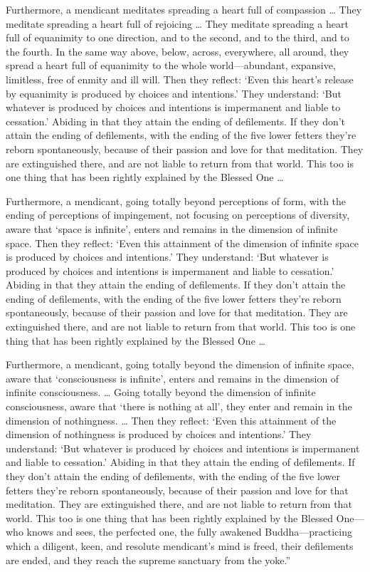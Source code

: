 \documentclass[12pt,openany]{book}%
\begin{document}
Furthermore, a mendicant meditates spreading a heart full of compassion … They meditate spreading a heart full of rejoicing … They meditate spreading a heart full of equanimity to one direction, and to the second, and to the third, and to the fourth. In the same way above, below, across, everywhere, all around, they spread a heart full of equanimity to the whole world—abundant, expansive, limitless, free of enmity and ill will. Then they reflect: ‘Even this heart’s release by equanimity is produced by choices and intentions.’ They understand: ‘But whatever is produced by choices and intentions is impermanent and liable to cessation.’ Abiding in that they attain the ending of defilements. If they don’t attain the ending of defilements, with the ending of the five lower fetters they’re reborn spontaneously, because of their passion and love for that meditation. They are extinguished there, and are not liable to return from that world. This too is one thing that has been rightly explained by the Blessed One … 

Furthermore, a mendicant, going totally beyond perceptions of form, with the ending of perceptions of impingement, not focusing on perceptions of diversity, aware that ‘space is infinite’, enters and remains in the dimension of infinite space. Then they reflect: ‘Even this attainment of the dimension of infinite space is produced by choices and intentions.’ They understand: ‘But whatever is produced by choices and intentions is impermanent and liable to cessation.’ Abiding in that they attain the ending of defilements. If they don’t attain the ending of defilements, with the ending of the five lower fetters they’re reborn spontaneously, because of their passion and love for that meditation. They are extinguished there, and are not liable to return from that world. This too is one thing that has been rightly explained by the Blessed One … 

Furthermore, a mendicant, going totally beyond the dimension of infinite space, aware that ‘consciousness is infinite’, enters and remains in the dimension of infinite consciousness. … Going totally beyond the dimension of infinite consciousness, aware that ‘there is nothing at all’, they enter and remain in the dimension of nothingness. … Then they reflect: ‘Even this attainment of the dimension of nothingness is produced by choices and intentions.’ They understand: ‘But whatever is produced by choices and intentions is impermanent and liable to cessation.’ Abiding in that they attain the ending of defilements. If they don’t attain the ending of defilements, with the ending of the five lower fetters they’re reborn spontaneously, because of their passion and love for that meditation. They are extinguished there, and are not liable to return from that world. This too is one thing that has been rightly explained by the Blessed One—who knows and sees, the perfected one, the fully awakened Buddha—practicing which a diligent, keen, and resolute mendicant’s mind is freed, their defilements are ended, and they reach the supreme sanctuary from the yoke.” 
\end{document}
